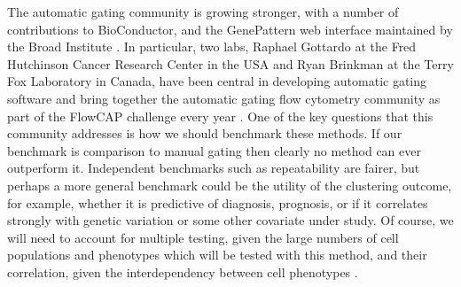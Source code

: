 The automatic gating community is growing stronger, with a number of contributions to BioConductor, and the GenePattern web interface maintained by the Broad Institute \citep{Kvistborg:2015}.
In particular, two labs, Raphael Gottardo at the Fred Hutchinson Cancer Research Center in the USA and Ryan Brinkman at the Terry Fox Laboratory in Canada, have been central in developing automatic gating software and bring together the automatic gating flow cytometry community as part of the FlowCAP challenge every year \citep{Aghaeepour:2013dg}.
One of the key questions that this community addresses is how we should benchmark these methods.
If our benchmark is comparison to manual gating then clearly no method can ever outperform it.
Independent benchmarks such as repeatability are fairer, but perhaps a more general benchmark could be the utility of the clustering outcome, for example, whether it is predictive of diagnosis, prognosis, or if it correlates strongly with genetic variation or some other covariate under study.
Of course, we will need to account for multiple testing, given the large numbers of cell populations and phenotypes which will be tested with this method, and their correlation, given the interdependency between cell phenotypes \citep{Roederer:2015eu}.



